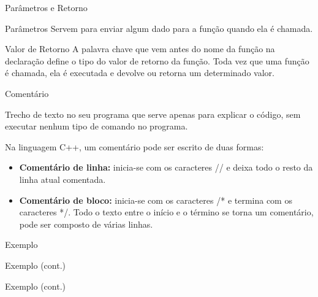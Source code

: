 \begin{frame}{Parâmetros e Retorno}
	\begin{block}{Parâmetros}
		Servem para enviar algum dado para a função quando ela é chamada.
	\end{block}
	
	\begin{block}{Valor de Retorno}
		A palavra chave que vem antes do nome da função na declaração define o tipo do valor de retorno da função. Toda vez que uma função é chamada, ela é executada e devolve ou retorna um determinado valor.
	\end{block}
\end{frame}

\begin{frame}{Comentário}
	\begin{block}{}
		Trecho de texto no seu programa que serve apenas para explicar o código, sem executar nenhum tipo de comando no programa.
	\end{block}
	
	Na linguagem C++, um comentário pode ser escrito de duas formas:
	\begin{itemize}
		\item \textbf{Comentário de linha:} inicia-se com os caracteres // e deixa todo o resto da linha atual comentada.
		\item \textbf{Comentário de bloco:} inicia-se com os caracteres /* e termina com os caracteres */. Todo o texto entre o início e o término se torna um comentário, pode ser composto de várias linhas.
	\end{itemize}
\end{frame}

\begin{frame}{Exemplo}
	
\end{frame}

\begin{frame}{Exemplo (cont.)}
	
\end{frame}

\begin{frame}{Exemplo (cont.)}
	
\end{frame}

